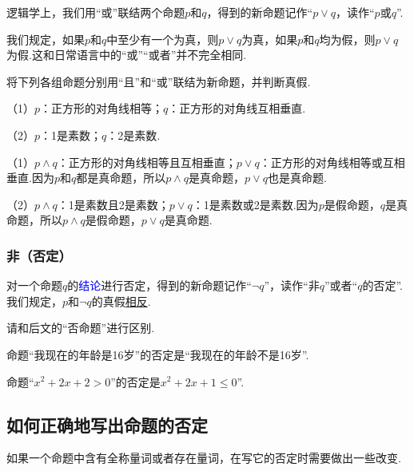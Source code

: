 \documentclass[lang=cn,math=cm,chinesefont=nofont,11pt,scheme=chinese,twocol]{elegantbook}
\begin{document}
逻辑学上，我们用“或”联结两个命题$p$和$q$，得到的新命题记作“$p\lor q$，读作“$p$或$q$”.

我们规定，如果$p$和$q$中至少有一个为真，则$p\lor q$为真，如果$p$和$q$均为假，则$p\lor q$为假.这和日常语言中的“或”“或者”并不完全相同.

\hspace*{\fill}

\begin{example}
  将下列各组命题分别用“且”和“或”联结为新命题，并判断真假.
\end{example}

（1）$p$：正方形的对角线相等；$q$：正方形的对角线互相垂直.

（2）$p$：1是素数；$q$：2是素数.

\begin{solution}
  （1）$p\land q$：正方形的对角线相等且互相垂直；$p\lor q$：正方形的对角线相等或互相垂直.因为$p$和$q$都是真命题，所以$p\land q$是真命题，$p\lor q$也是真命题.

  （2）$p\land q$：1是素数且2是素数；$p\lor q$：1是素数或2是素数.因为$p$是假命题，$q$是真命题，所以$p\land q$是假命题，$p\lor q$是真命题.
\end{solution}

\subsubsection{非（否定）}

对一个命题$q$的\textcolor{blue}{结论}进行否定，得到的新命题记作“$\neg q$”，读作“非$q$”或者“$q$的否定”.我们规定，$p$和$\neg q$的真假\underline{相反}.

\begin{remark}
  请和后文的“否命题”进行区别.
\end{remark}

\begin{example}
  命题“我现在的年龄是16岁”的否定是“我现在的年龄不是16岁”.
\end{example}

\begin{example}
  命题“$x^2+2x+2>0$”的否定是$x^2+2x+1\leq 0$”.
\end{example}

\subsection{如何正确地写出命题的否定}

如果一个命题中含有全称量词或者存在量词，在写它的否定时需要做出一些改变.
\end{document}

